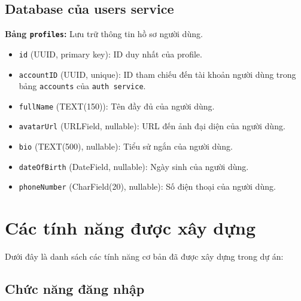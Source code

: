 \subsection{Database của users service}
\label{subsec:db_users_service}

\textbf{Bảng \texttt{profiles}:} Lưu trữ thông tin hồ sơ người dùng.
\begin{itemize}
    \item \texttt{id} (UUID, primary key): ID duy nhất của profile.
    \item \texttt{accountID} (UUID, unique): ID tham chiếu đến tài khoản người dùng trong bảng \texttt{accounts} của \texttt{auth service}.
    \item \texttt{fullName} (TEXT(150)): Tên đầy đủ của người dùng.
    \item \texttt{avatarUrl} (URLField, nullable): URL đến ảnh đại diện của người dùng.
    \item \texttt{bio} (TEXT(500), nullable): Tiểu sử ngắn của người dùng.
    \item \texttt{dateOfBirth} (DateField, nullable): Ngày sinh của người dùng.
    \item \texttt{phoneNumber} (CharField(20), nullable): Số điện thoại của người dùng.
\end{itemize}

\section{Các tính năng được xây dựng}
\label{sec:built_features}

Dưới đây là danh sách các tính năng cơ bản đã được xây dựng trong dự án:

\subsection{Chức năng đăng nhập}
\label{subsec:dang-nhap}

